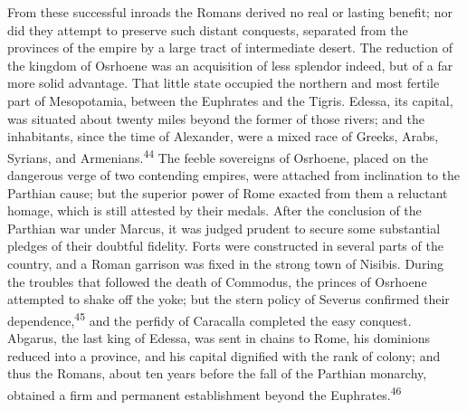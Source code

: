 




From these successful inroads the Romans derived no real or
lasting benefit; nor did they attempt to preserve such distant
conquests, separated from the provinces of the empire by a large
tract of intermediate desert. The reduction of the kingdom of
Osrhoene was an acquisition of less splendor indeed, but of a far
more solid advantage. That little state occupied the northern and
most fertile part of Mesopotamia, between the Euphrates and the
Tigris. Edessa, its capital, was situated about twenty miles
beyond the former of those rivers; and the inhabitants, since the
time of Alexander, were a mixed race of Greeks, Arabs, Syrians,
and Armenians.\textsuperscript{44} The feeble sovereigns of Osrhoene, placed on
the dangerous verge of two contending empires, were attached from
inclination to the Parthian cause; but the superior power of Rome
exacted from them a reluctant homage, which is still attested by
their medals. After the conclusion of the Parthian war under
Marcus, it was judged prudent to secure some substantial pledges
of their doubtful fidelity. Forts were constructed in several
parts of the country, and a Roman garrison was fixed in the
strong town of Nisibis. During the troubles that followed the
death of Commodus, the princes of Osrhoene attempted to shake off
the yoke; but the stern policy of Severus confirmed their
dependence,\textsuperscript{45} and the perfidy of Caracalla completed the easy
conquest. Abgarus, the last king of Edessa, was sent in chains to
Rome, his dominions reduced into a province, and his capital
dignified with the rank of colony; and thus the Romans, about ten
years before the fall of the Parthian monarchy, obtained a firm
and permanent establishment beyond the Euphrates.\textsuperscript{46}

